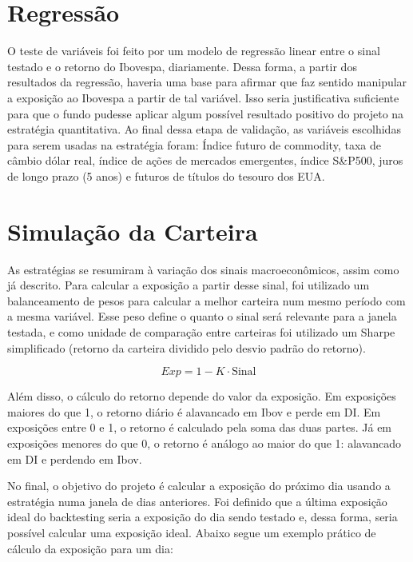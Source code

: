 \section{Regressão}

O teste de variáveis foi feito por um modelo de regressão linear entre o sinal testado e o retorno do Ibovespa, diariamente. Dessa forma, a partir dos resultados da regressão, haveria uma base para afirmar que faz sentido manipular a exposição ao Ibovespa a partir de tal variável. Isso seria justificativa suficiente para que o fundo pudesse aplicar algum possível resultado positivo do projeto na estratégia quantitativa.
Ao final dessa etapa de validação, as variáveis escolhidas para serem usadas na estratégia foram: Índice futuro de commodity, taxa de câmbio dólar real, índice de ações de mercados emergentes, índice S\&P500, juros de longo prazo (5 anos) e futuros de títulos do tesouro dos EUA.

\section{Simulação da Carteira}

As estratégias se resumiram à variação dos sinais macroeconômicos, assim como já descrito. Para calcular a exposição a partir desse sinal, foi utilizado um balanceamento de pesos para calcular a melhor carteira num mesmo período com a mesma variável. Esse peso define o quanto o sinal será relevante para a janela testada, e como unidade de comparação entre carteiras foi utilizado um Sharpe simplificado (retorno da carteira dividido pelo desvio padrão do retorno). 

\begin{equation*}
    Exp = 1 - K \cdot \text{Sinal}
\end{equation*}

Além disso, o cálculo do retorno depende do valor da exposição. Em exposições maiores do que 1, o retorno diário é alavancado em Ibov e perde em DI. Em exposições entre 0 e 1, o retorno é calculado pela soma das duas partes. Já em exposições menores do que 0, o retorno é análogo ao maior do que 1: alavancado em DI e perdendo em Ibov.

No final, o objetivo do projeto é calcular a exposição do próximo dia usando a estratégia numa janela de dias anteriores. Foi definido que a última exposição ideal do backtesting seria a exposição do dia sendo testado e, dessa forma, seria possível calcular uma exposição ideal. Abaixo segue um exemplo prático de cálculo da exposição para um dia:

